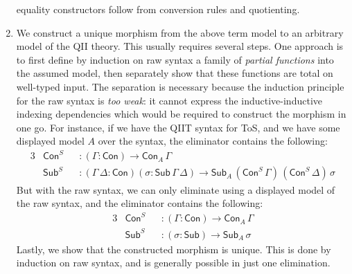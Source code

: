 \documentclass[12pt,a4paper,twoside,openany]{book}
\theoremstyle{remark}
\theoremstyle{definition}
\theoremstyle{theorem}
\newcommand{\Con}{\mathsf{Con}}
\newcommand{\Sub}{\mathsf{Sub}}
\begin{document}
\begin{enumerate}
    equality constructors follow from conversion rules and quotienting.
  \item
    We construct a unique morphism from the above term model to an arbitrary
    model of the QII theory. This usually requires several steps. One approach
    is to first define by induction on raw syntax a family of \emph{partial
    functions} into the assumed model, then separately show that these functions
    are total on well-typed input. The separation is necessary because the
    induction principle for the raw syntax is \emph{too weak}: it cannot express
    the inductive-inductive indexing dependencies which would be required to
    construct the morphism in one go. For instance, if we have the QIIT syntax
    for ToS, and we have some displayed model $A$ over the syntax, the
    eliminator contains the following:
    \begin{alignat*}{3}
      &\Con^S &&: (\Gamma : \Con) \to \Con_A\,\Gamma \\
      &\Sub^S &&: (\Gamma\,\Delta : \Con)(\sigma : \Sub\,\Gamma\,\Delta) \to \Sub_{A}\,(\Con^S\,\Gamma)\,(\Con^S\,\Delta)\,\sigma
    \end{alignat*}
    But with the raw syntax, we can only eliminate using a displayed model of
    the raw syntax, and the eliminator contains the following:
    \begin{alignat*}{3}
      &\Con^S &&: (\Gamma : \Con) \to \Con_A\,\Gamma \\
      &\Sub^S &&: (\sigma : \Sub) \to \Sub_A\,\sigma
    \end{alignat*}
    Lastly, we show that the constructed morphism is unique. This is done by
    induction on raw syntax, and is generally possible in just one elimination.
\end{enumerate}
\end{document}
